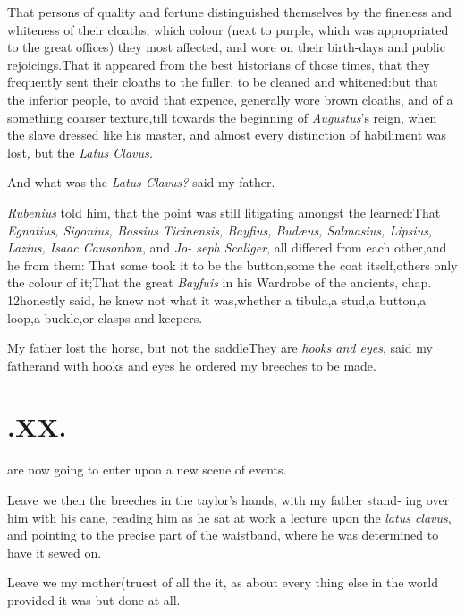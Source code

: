 \documentclass{article}
\begin{document}
\tsh That persons of quality and fortune distinguished
themselves by the fineness and whiteness of their cloaths; which
colour (next to purple, which was appropriated to the great
offices) they most affected, and wore on their
birth-days and
public rejoicings.\tsh That it appeared from the best
historians of those times, that they frequently sent their cloaths
to the fuller, to be cleaned and whitened:\tsh but
that the inferior people, to avoid that expence, generally wore
brown cloaths, and of a something coarser texture,\tsk till
towards the beginning of \textit{Augustus}’s reign, when the
slave dressed like his master, and almost every distinction of
habiliment was lost, but the \textit{Latus Clavus.}

And what was the \textit{Latus Clavus?} said my father.

\textit{Rubenius} told him, that the point was still litigating
amongst the learned:\tsh That \textit{Egnatius, Sigonius,
Bossius Tici\-nensis, Bayfius, Budæus, Salmasius, Lipsius,
Lazius, Isaac Causonbon}, and \textit{Jo- seph Scaliger}, all
differed from each other,\tsk and he from them: That some took it
to be the button,\tsk some the coat itself,\tsk others only the
colour of it;\tsk That the great \textit{Bayfuis} in his
Wardrobe\break
of the ancients, chap. 12\tsk honestly said, he knew not what it
was,\tsk whether a tibula,\tsk a stud,\tsk a button,\tsk a
loop,\tsk a buckle,\tsk or clasps and
keepers.\tsh

\tsh My father lost the horse, but not the
saddle\tsh They are \textit{hooks and eyes}, said my
father\tsh and with hooks and eyes he ordered my breeches
to be made.

\section{.\enspace XX.}

 are now going to enter upon a new
scene of events.\tsh

\tsh Leave we then the breeches in the taylor’s
hands, with my father stand- ing over him with his cane, reading him
as he sat at work a lecture upon the \textit{latus clavus}, and
pointing to the precise part of the waistband, where he was
determined to have it sewed on.\tsh

Leave we my mother\tsk (truest of all the\break
{}\break
it, as about every thing else in the world
\tsk provided it was but done at all.\tsh
\end{document}
